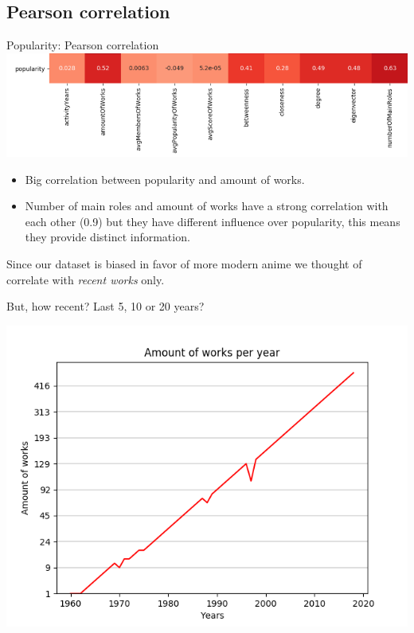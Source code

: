 \subsection{Pearson correlation}
\begin{frame}{Popularity: Pearson correlation}
\includegraphics[scale=0.45]{graphics/popCorrelationAllWorks.png} 
\begin{itemize}
\item Big correlation between popularity and amount of works. %
\item Number of main roles and amount of works have a strong correlation with each other (0.9) but they have different influence over popularity, this means they provide distinct information.
\end{itemize}

\end{frame}

\begin{frame}
Since our dataset is biased in favor of more modern anime we thought of correlate with \emph{recent works} only.
\vspace{5pt}

But, how recent? Last 5, 10 or 20 years? 
\vspace{-5pt}

\begin{center}
\includegraphics[scale=0.6]{graphics/worksPerYear_1960-2018.png} 
\end{center}

\end{frame}

